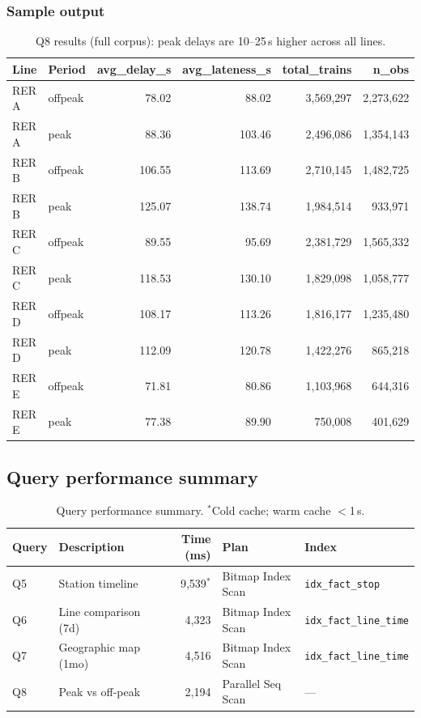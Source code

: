 \documentclass[a4paper,11pt]{article}
\begin{document}
\subsubsection{Sample output}

\begin{table}[H]
\centering
\begin{tabular}{llrrrr}
\toprule
\textbf{Line} & \textbf{Period} & \textbf{avg\_delay\_s} & \textbf{avg\_lateness\_s}
  & \textbf{total\_trains} & \textbf{n\_obs} \\
\midrule
RER A & offpeak &  78.02 &  88.02 & 3{,}569{,}297 & 2{,}273{,}622 \\
RER A & peak    &  88.36 & 103.46 & 2{,}496{,}086 & 1{,}354{,}143 \\
RER B & offpeak & 106.55 & 113.69 & 2{,}710{,}145 & 1{,}482{,}725 \\
RER B & peak    & 125.07 & 138.74 & 1{,}984{,}514 &   933{,}971 \\
RER C & offpeak &  89.55 &  95.69 & 2{,}381{,}729 & 1{,}565{,}332 \\
RER C & peak    & 118.53 & 130.10 & 1{,}829{,}098 & 1{,}058{,}777 \\
RER D & offpeak & 108.17 & 113.26 & 1{,}816{,}177 & 1{,}235{,}480 \\
RER D & peak    & 112.09 & 120.78 & 1{,}422{,}276 &   865{,}218 \\
RER E & offpeak &  71.81 &  80.86 & 1{,}103{,}968 &   644{,}316 \\
RER E & peak    &  77.38 &  89.90 &   750{,}008 &   401{,}629 \\
\bottomrule
\end{tabular}
\caption{Q8 results (full corpus): peak delays are 10--25\,s higher across all lines.}
\label{tab:q8}
\end{table}


\subsection{Query performance summary}

\begin{table}[H]
\centering
\small
\begin{tabular}{llrll}
\toprule
\textbf{Query} & \textbf{Description} & \textbf{Time (ms)} &
  \textbf{Plan} & \textbf{Index} \\
\midrule
Q5 & Station timeline     & 9,539$^\ast$ & Bitmap Index Scan &
  \texttt{idx\_fact\_stop} \\
Q6 & Line comparison (7d) & 4,323 & Bitmap Index Scan &
  \texttt{idx\_fact\_line\_time} \\
Q7 & Geographic map (1mo) & 4,516 & Bitmap Index Scan &
  \texttt{idx\_fact\_line\_time} \\
Q8 & Peak vs off-peak     & 2,194 & Parallel Seq Scan & --- \\
\bottomrule
\end{tabular}
\caption{Query performance summary. $^\ast$Cold cache; warm cache $<$1\,s.}
\label{tab:query-summary}
\end{table}
\end{document}
